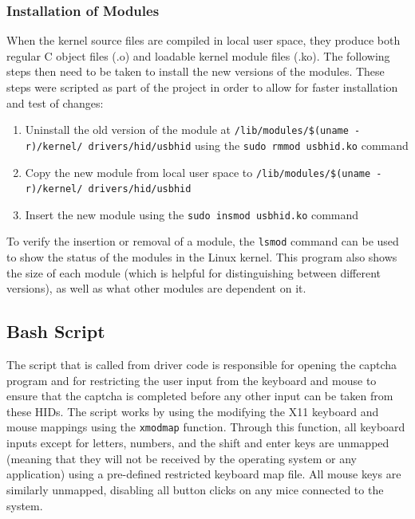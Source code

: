 \documentclass[pagenumbers]{ieee}
\begin{document}
\subsubsection{Installation of Modules}

When the kernel source files are compiled in local user space, they produce both regular C object files (.o) and loadable kernel module files (.ko). The following steps then need to be taken to install the new versions of the modules. These steps were scripted as part of the project in order to allow for faster installation and test of changes:

\begin{enumerate}
\item Uninstall the old version of the module at \texttt{/lib/modules/\$(uname -r)/kernel/ drivers/hid/usbhid} using the \texttt{sudo rmmod usbhid.ko} command
\item Copy the new module from local user space to \texttt{/lib/modules/\$(uname -r)/kernel/ drivers/hid/usbhid}
\item Insert the new module using the \texttt{sudo insmod usbhid.ko} command
\end{enumerate} 

To verify the insertion or removal of a module, the \texttt{lsmod} command can be used to show the status of the modules in the Linux kernel. This program also shows the size of each module (which is helpful for distinguishing between different versions), as well as what other modules are dependent on it.


\subsection{Bash Script}
\label{section:bash}

The script that is called from driver code is responsible for opening the captcha program and for restricting the user input from the keyboard and mouse to ensure that the captcha is completed before any other input can be taken from these HIDs.  The script works by using the modifying the X11 keyboard and mouse mappings using the \texttt{xmodmap} function. Through this function, all keyboard inputs except for letters, numbers, and the shift and enter keys are unmapped (meaning that they will not be received by the operating system or any application) using a pre-defined restricted keyboard map file. All mouse keys are similarly unmapped, disabling all button clicks on any mice connected to the system. 
\end{document}

